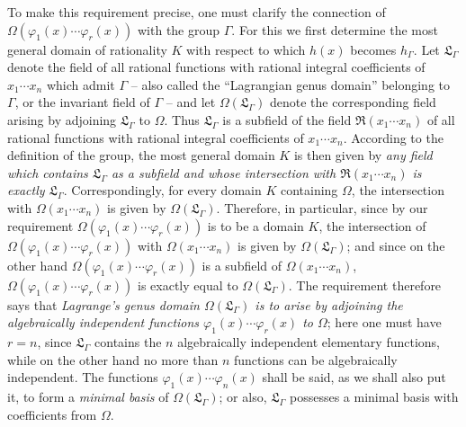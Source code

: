 \documentclass[11pt]{article}
\begin{document}
To make this requirement precise, one must clarify the connection of $\Omega(\varphi_1(x)\cdots\varphi_r(x))$ with the group $\Gamma$. For this we first determine the most general domain of rationality $K$ with respect to which $h(x)$ becomes $h_\Gamma$. Let $\mathfrak L_\Gamma$ denote the field of all rational functions with rational integral coefficients of $x_1\cdots x_n$ which admit $\Gamma$ -- also called the ``Lagrangian genus domain'' belonging to $\Gamma$, or the invariant field of $\Gamma$ -- and let $\Omega(\mathfrak L_\Gamma)$ denote the corresponding field arising by adjoining $\mathfrak L_\Gamma$ to $\Omega$. Thus $\mathfrak L_\Gamma$ is a subfield of the field $\mathfrak R(x_1\cdots x_n)$ of all rational functions with rational integral coefficients of $x_1\cdots x_n$. According to the definition of the group, the most general domain $K$ is then given by \emph{any field which contains $\mathfrak L_\Gamma$ as a subfield and whose intersection with $\mathfrak R(x_1\cdots x_n)$ is exactly $\mathfrak L_\Gamma$}. Correspondingly, for every domain $K$ containing $\Omega$, the intersection with $\Omega(x_1\cdots x_n)$ is given by $\Omega(\mathfrak L_\Gamma)$. Therefore, in particular, since by our requirement $\Omega(\varphi_1(x)\cdots\varphi_r(x))$ is to be a domain $K$, the intersection of $\Omega(\varphi_1(x)\cdots\varphi_r(x))$ with $\Omega(x_1\cdots x_n)$ is given by $\Omega(\mathfrak L_\Gamma)$; and since on the other hand $\Omega(\varphi_1(x)\cdots\varphi_r(x))$ is a subfield of $\Omega(x_1\cdots x_n)$, $\Omega(\varphi_1(x)\cdots\varphi_r(x))$ is exactly equal to $\Omega(\mathfrak L_\Gamma)$. The requirement therefore says that \emph{Lagrange's genus domain $\Omega(\mathfrak L_\Gamma)$ is to arise by adjoining the algebraically independent functions $\varphi_1(x)\cdots\varphi_r(x)$ to $\Omega$}; here one must have $r=n$, since $\mathfrak L_\Gamma$ contains the $n$ algebraically independent elementary functions, while on the other hand no more than $n$ functions can be algebraically independent. The functions $\varphi_1(x)\cdots\varphi_n(x)$ shall be said, as we shall also put it, to form a \emph{minimal basis} of $\Omega(\mathfrak L_\Gamma)$; or also, $\mathfrak L_\Gamma$ possesses a minimal basis with coefficients from $\Omega$.
\end{document}
